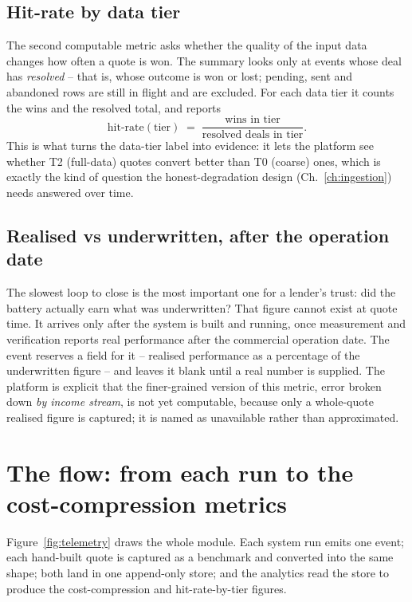 \subsection{Hit-rate by data tier}

The second computable metric asks whether the quality of the input data changes how often a quote is won. The summary looks only at events whose deal has \emph{resolved} -- that is, whose outcome is won or lost; pending, sent and abandoned rows are still in flight and are excluded. For each data tier it counts the wins and the resolved total, and reports
\[
\text{hit-rate}(\text{tier}) \;=\; \frac{\text{wins in tier}}{\text{resolved deals in tier}}.
\]
This is what turns the data-tier label into evidence: it lets the platform see whether T2 (full-data) quotes convert better than T0 (coarse) ones, which is exactly the kind of question the honest-degradation design (Ch.~\ref{ch:ingestion}) needs answered over time.

\subsection{Realised vs underwritten, after the operation date}

The slowest loop to close is the most important one for a lender's trust: did the battery actually earn what was underwritten? That figure cannot exist at quote time. It arrives only after the system is built and running, once measurement and verification reports real performance after the commercial operation date. The event reserves a field for it -- realised performance as a percentage of the underwritten figure -- and leaves it blank until a real number is supplied. The platform is explicit that the finer-grained version of this metric, error broken down \emph{by income stream}, is not yet computable, because only a whole-quote realised figure is captured; it is named as unavailable rather than approximated.

\section{The flow: from each run to the cost-compression metrics}

Figure~\ref{fig:telemetry} draws the whole module. Each system run emits one event; each hand-built quote is captured as a benchmark and converted into the same shape; both land in one append-only store; and the analytics read the store to produce the cost-compression and hit-rate-by-tier figures.

